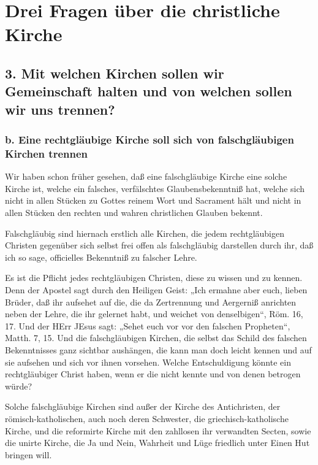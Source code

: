 \chapter{Drei Fragen über die christliche Kirche}

\section[3. Mit welchen Kirchen sollen wir …]{3. Mit welchen Kirchen sollen wir Gemeinschaft halten und von welchen sollen wir uns trennen?}

\subsection[b. Eine rechtgläubige Kirche soll …]{b. Eine rechtgläubige Kirche soll sich von falschgläubigen Kirchen trennen}

Wir haben schon früher gesehen, daß eine falschgläubige Kirche eine solche Kirche ist, welche ein falsches, verfälschtes Glaubensbekenntniß hat, welche sich nicht in allen Stücken zu Gottes reinem Wort und Sacrament hält und nicht in allen Stücken den rechten und wahren christlichen Glauben bekennt.

Falschgläubig sind hiernach erstlich alle Kirchen, die jedem rechtgläubigen Christen gegenüber sich selbst frei offen als falschgläubig darstellen durch ihr, daß ich so sage, officielles Bekenntniß zu falscher Lehre.

Es ist die Pflicht jedes rechtgläubigen Christen, diese zu wissen und zu kennen. Denn der Apostel sagt durch den Heiligen Geist: „Ich ermahne aber euch, lieben Brüder, daß ihr aufsehet auf die, die da Zertrennung und Aergerniß anrichten neben der Lehre, die ihr gelernet habt, und weichet von denselbigen“, Röm. 16, 17. Und der HErr JEsus sagt: „Sehet euch vor vor den falschen Propheten“, Matth. 7, 15. Und die falschgläubigen Kirchen, die selbst das Schild des falschen Bekenntnisses ganz sichtbar aushängen, die kann man doch leicht kennen und auf sie aufsehen und sich vor ihnen vorsehen. Welche Entschuldigung könnte ein rechtgläubiger Christ haben, wenn er die nicht kennte und von denen betrogen würde?


Solche falschgläubige Kirchen sind außer der Kirche des Antichristen, der römisch-katholischen, auch noch deren Schwester, die griechisch-katholische Kirche, und die reformirte Kirche mit den zahllosen ihr verwandten Secten, sowie die unirte Kirche, die Ja und Nein, Wahrheit und Lüge friedlich unter Einen Hut bringen will.

